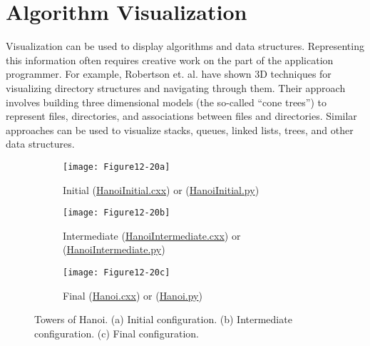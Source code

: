 \section{Algorithm Visualization}

Visualization can be used to display algorithms and data structures. Representing this information often requires creative work on the part of the application programmer. For example, Robertson et. al. \cite{Robertson91} have shown 3D techniques for visualizing directory structures and navigating through them. Their approach involves building three dimensional models (the so-called ``cone trees'') to represent files, directories, and associations between files and directories. Similar approaches can be used to visualize stacks, queues, linked lists, trees, and other data structures.

\begin{figure}[htb]
	\begin{subfigure}[h]{0.68\linewidth}
		\texttt{[image: Figure12-20a]}
		\caption{Initial (\href{https://lorensen.github.io/VTKExamples/site/Cxx/Visualization/HanoiInitial/}{HanoiInitial.cxx}) or (\href{https://lorensen.github.io/VTKExamples/site/Python/Visualization/HanoiInitial/}{HanoiInitial.py})}
		\label{fig:Figure12-20a}
	\end{subfigure}
	\hfill
	\begin{subfigure}[h]{0.68\linewidth}
		\texttt{[image: Figure12-20b]}
		\captionsetup{justification=centering}
		\caption{Intermediate (\href{https://lorensen.github.io/VTKExamples/site/Cxx/Visualization/HanoiIntermediate/}{HanoiIntermediate.cxx}) or (\href{https://lorensen.github.io/VTKExamples/site/Python/Visualization/HanoiIntermediate/}{HanoiIntermediate.py})}
		\label{fig:Figure12-20b}
	\end{subfigure}
	\hfill
	\begin{subfigure}[h]{0.68\linewidth}
		\texttt{[image: Figure12-20c]}
        \captionsetup{justification=centering}
		\caption{Final (\href{https://lorensen.github.io/VTKExamples/site/Cxx/Visualization/Hanoi/}{Hanoi.cxx}) or (\href{https://lorensen.github.io/VTKExamples/site/Python/Visualization/Hanoi/}{Hanoi.py})}
		\label{fig:Figure12-20c}
	\end{subfigure}
    \captionsetup{justification=centering}
	\caption{Towers of Hanoi. (a) Initial configuration. (b) Intermediate configuration. (c) Final configuration.}\label{fig:Figure12-20}
\end{figure}

